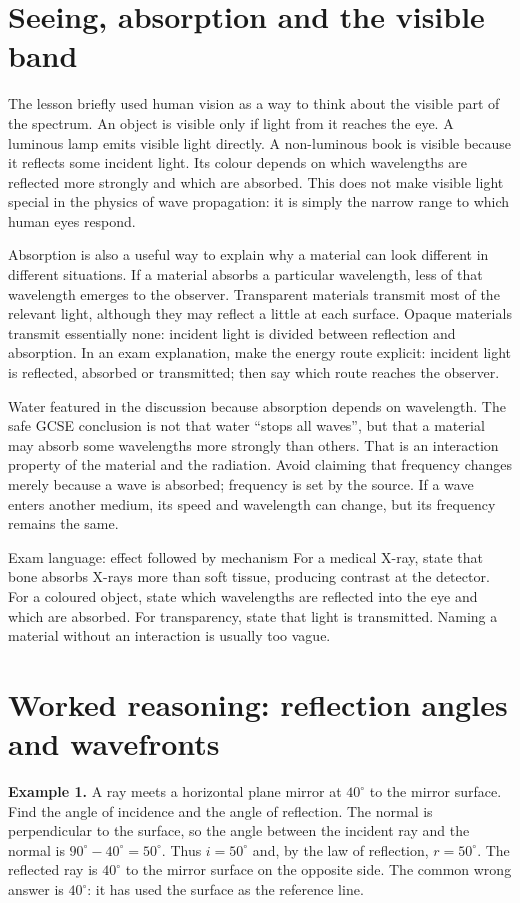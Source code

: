 \documentclass[10pt,a4paper]{article}
\begin{document}
\section{Seeing, absorption and the visible band}
The lesson briefly used human vision as a way to think about the visible part of the spectrum. An object is visible only if light from it reaches the eye. A luminous lamp emits visible light directly. A non-luminous book is visible because it reflects some incident light. Its colour depends on which wavelengths are reflected more strongly and which are absorbed. This does not make visible light special in the physics of wave propagation: it is simply the narrow range to which human eyes respond.

Absorption is also a useful way to explain why a material can look different in different situations. If a material absorbs a particular wavelength, less of that wavelength emerges to the observer. Transparent materials transmit most of the relevant light, although they may reflect a little at each surface. Opaque materials transmit essentially none: incident light is divided between reflection and absorption. In an exam explanation, make the energy route explicit: incident light is reflected, absorbed or transmitted; then say which route reaches the observer.

Water featured in the discussion because absorption depends on wavelength. The safe GCSE conclusion is not that water “stops all waves”, but that a material may absorb some wavelengths more strongly than others. That is an interaction property of the material and the radiation. Avoid claiming that frequency changes merely because a wave is absorbed; frequency is set by the source. If a wave enters another medium, its speed and wavelength can change, but its frequency remains the same.

\begin{keybox}{Exam language: effect followed by mechanism}
For a medical X-ray, state that bone absorbs X-rays more than soft tissue, producing contrast at the detector. For a coloured object, state which wavelengths are reflected into the eye and which are absorbed. For transparency, state that light is transmitted. Naming a material without an interaction is usually too vague.
\end{keybox}

\section{Worked reasoning: reflection angles and wavefronts}
\textbf{Example 1.} A ray meets a horizontal plane mirror at $40^\circ$ to the mirror surface. Find the angle of incidence and the angle of reflection. The normal is perpendicular to the surface, so the angle between the incident ray and the normal is $90^\circ-40^\circ=50^\circ$. Thus $i=50^\circ$ and, by the law of reflection, $r=50^\circ$. The reflected ray is $40^\circ$ to the mirror surface on the opposite side. The common wrong answer is $40^\circ$: it has used the surface as the reference line.
\end{document}
